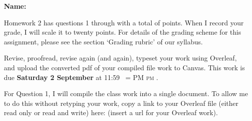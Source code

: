 \documentclass[12pt,fleqn,answers]{exam}
\makeatletter
\newcommand{\quiz}{2}
\newcommand{\term}{Fall}
\DeclareRobustCommand{\maybefakesc}[1]{%
  \ifnum\pdfstrcmp{\f@series}{\bfdefault}=\z@
    {\fontsize{\dimexpr0.8\dimexpr\f@size pt\relax}{0}\selectfont\uppercase{#1}}%
  \else
    \textsc{#1}%
  \fi
}
\newcommand\PM{\,\maybefakesc{pm}\xspace}
\makeatother
\begin{document}
\large
\vspace{0.1in}
\noindent{}
{\bf Name:}  \\
\noindent \makebox[3.0truein][l]{\textbf{Homework \quiz, \term \/ \the\year}}
\vspace{0.1in}

\noindent  Homework \quiz\/  has questions 1 through  \numquestions \/ with a total 
of  \numpoints\/  points. When I record your grade, I will scale it to twenty points. 
For details of the grading scheme for this assignment, please see the section 
`Grading rubric' of our syllabus.

Revise, proofread, revise again (and again), typeset your work using Overleaf, and 
upload the converted pdf of your compiled file work to Canvas.  
This work is due \textbf{Saturday 2 September} at 11:59 \PM.

\vspace{0.1in}

For Question 1, I will compile the class work into a single document. To allow me to do this without retyping your work,
copy a link to your Overleaf file (either read only or read and write) here: \url{  } (insert a url for your Overleaf work).
\end{document}
